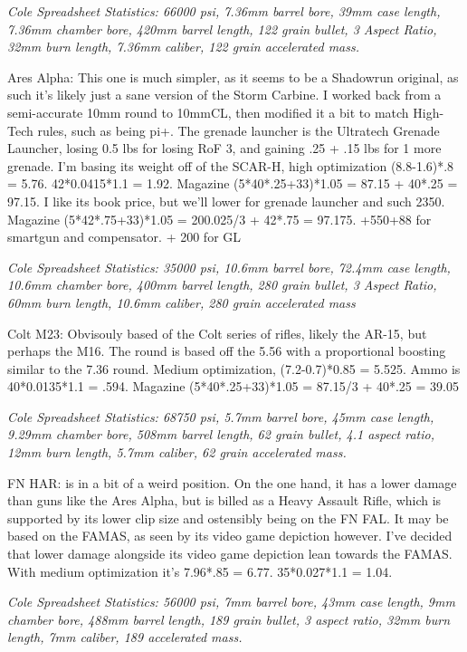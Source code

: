 \begin{multicols*}{2}
	\textit{\textcolor{OliveGreen}{Cole Spreadsheet Statistics: 66000 psi, 7.36mm barrel bore, 39mm case length, 7.36mm chamber bore, 420mm barrel length, 122 grain bullet, 3 Aspect Ratio, 32mm burn length, 7.36mm caliber, 122 grain accelerated mass.}}
	
	Ares Alpha: This one is much simpler, as it seems to be a Shadowrun original, as such it's likely just a sane version of the Storm Carbine. I worked back from a semi-accurate 10mm round to 10mmCL, then modified it a bit to match High-Tech rules, such as being pi+. The grenade launcher is the Ultratech Grenade Launcher, losing 0.5 lbs for losing RoF 3, and gaining .25 + .15 lbs for 1 more grenade. I'm basing its weight off of the SCAR-H, high optimization (8.8-1.6)*.8 = 5.76. 42*0.0415*1.1 = 1.92. Magazine (5*40*.25+33)*1.05 = 87.15 + 40*.25 = 97.15. I like its book price, but we'll lower for grenade launcher and such 2350. Magazine (5*42*.75+33)*1.05 = 200.025/3 + 42*.75 = 97.175. +550+88 for smartgun and compensator. + 200 for GL
	
	\textit{\textcolor{OliveGreen}{Cole Spreadsheet Statistics: 35000 psi, 10.6mm barrel bore, 72.4mm case length, 10.6mm chamber bore, 400mm barrel length, 280 grain bullet, 3 Aspect Ratio, 60mm burn length, 10.6mm caliber, 280 grain accelerated mass}}
	
	Colt M23: Obvisouly based of the Colt series of rifles, likely the AR-15, but perhaps the M16. The round is based off the 5.56 with a proportional boosting similar to the 7.36 round. Medium optimization, (7.2-0.7)*0.85 = 5.525. Ammo is 40*0.0135*1.1 = .594. Magazine (5*40*.25+33)*1.05 = 87.15/3 + 40*.25 = 39.05
	
	\textit{\textcolor{OliveGreen}{Cole Spreadsheet Statistics: 68750 psi, 5.7mm barrel bore, 45mm case length, 9.29mm chamber bore, 508mm barrel length, 62 grain bullet, 4.1 aspect ratio, 12mm burn length, 5.7mm caliber, 62 grain accelerated mass.}}
	
	FN HAR: is in a bit of a weird position. On the one hand, it has a lower damage than guns like the Ares Alpha, but is billed as a Heavy Assault Rifle, which is supported by its lower clip size and ostensibly being on the FN FAL. It may be based on the FAMAS, as seen by its video game depiction however. I've decided that lower damage alongside its video game depiction lean towards the FAMAS. With medium optimization it's 7.96*.85 = 6.77. 35*0.027*1.1 = 1.04.
	
	\textit{\textcolor{OliveGreen}{Cole Spreadsheet Statistics:  56000 psi, 7mm barrel bore, 43mm case length, 9mm chamber bore, 488mm barrel length, 189 grain bullet, 3 aspect ratio, 32mm burn length, 7mm caliber, 189 accelerated mass.}}
	

\end{multicols*}
